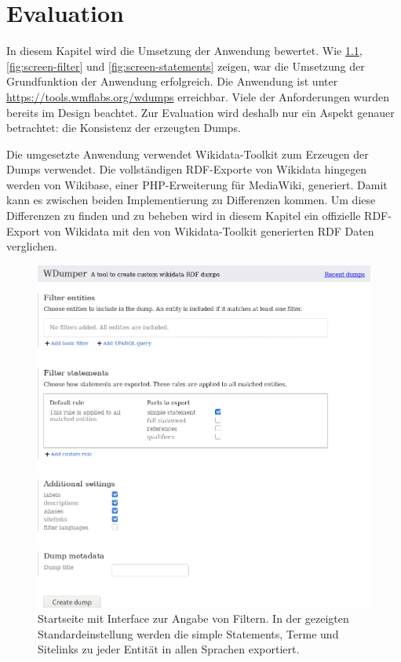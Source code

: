 \chapter{Evaluation}
\label{chap:evaluation}
In diesem Kapitel wird die Umsetzung der Anwendung bewertet.
Wie \cref{fig:screen-main}, \cref{fig:screen-filter} und \cref{fig:screen-statements} zeigen, war die Umsetzung der Grundfunktion der Anwendung erfolgreich.
Die Anwendung ist unter \url{https://tools.wmflabs.org/wdumps} erreichbar.
Viele der Anforderungen wurden bereits im Design beachtet.
Zur Evaluation wird deshalb nur ein Aspekt genauer betrachtet: die Konsistenz der erzeugten Dumps.

Die umgesetzte Anwendung verwendet Wikidata-Toolkit zum Erzeugen der Dumps verwendet.
Die vollständigen RDF-Exporte von Wikidata hingegen werden von Wikibase, einer PHP-Erweiterung für MediaWiki, generiert.
Damit kann es zwischen beiden Implementierung zu Differenzen kommen.
Um diese Differenzen zu finden und zu beheben wird in diesem Kapitel ein offizielle RDF-Export von Wikidata mit den von Wikidata-Toolkit generierten RDF Daten verglichen. 

\begin{figure}
  \includegraphics[width=\textwidth]{pics/screen-main}
  \caption{Startseite mit Interface zur Angabe von Filtern. In der gezeigten Standardeinstellung werden die simple Statements, Terme und Sitelinks zu jeder Entität in allen Sprachen exportiert.}
  \label{fig:screen-main}
\end{figure}

